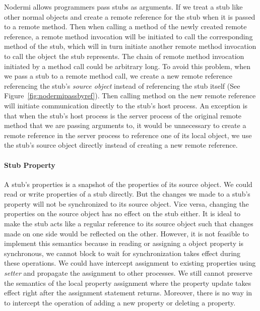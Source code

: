 Nodermi allows programmers pass stubs as arguments.
If we treat a stub like other normal objects and create a remote reference 
 for the stub when it is passed to a remote method. 
Then when calling a method of the newly created remote reference,
a remote method invocation will be initiated to call the corresponding method
of the stub, which will in turn initiate another remote method invocation
to call the object the stub represents.
The chain of remote method invocation initiated by a method call could
be arbitrary long.
To avoid this problem, when we pass a stub to a remote method call,
we create a new remote reference referencing 
 the stub's \emph{source object} instead of referencing the stub itself
 (See Figure~\ref{fig:nodermipassbyref}).
Then calling method on the new remote reference will initiate 
communication directly to the stub's host process.
An exception is that when the stub's host process is the server
process of the original remote method that we are passing arguments to,
it would be unnecessary to create a remote reference 
in the server process to reference one of its local object,
we use the stub's source object directly instead of 
creating a new remote reference.


\paragraph{Stub Property}
A stub's properties is a snapshot of the properties
of its source object.
We could read or write properties of a stub directly.
But the changes we made to a stub's property
will not be synchronized to its source object.
Vice versa,
changing the properties on the source object has no effect
on the stub either.
It is ideal to make the stub acts like a regular reference
to its source object such that
changes made on one side would be reflected on the other.
However, it is not feasible to implement this semantics because
in \js{} reading or assigning a object property is synchronous,
we cannot block to wait for synchronization takes effect
 during these operations.
We could have intercept assignment to existing properties using
\emph{setter} and propagate the assignment to other processes.
We still cannot preserve the semantics of the local property assignment
where the property update takes effect right after the assignment statement returns.
Moreover, there is no way in \js{} to intercept the operation of
adding a new property or deleting a property.




